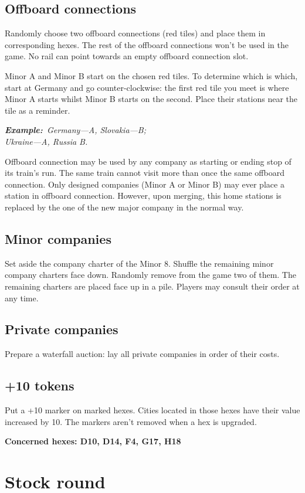 \documentclass[10pt,a4paper,twocolumn]{article}
\newcommand{\Example}{\textbf{Example:}}
\begin{document}
\subsection{Offboard connections}
Randomly choose two offboard connections (red tiles) and place them in corresponding hexes. The rest of the offboard connections won't be used in the game. No rail can point towards an empty offboard connection slot.

Minor A and Minor B start on the chosen red tiles. To determine which is which, start at Germany and go counter-clockwise: the first red tile you meet is where Minor A starts whilst Minor B starts on the second. Place their stations near the tile as a reminder.

\textit{\Example~Germany—A, Slovakia—B;\\Ukraine—A, Russia B.}

Offboard connection may be used by any company as starting or ending stop of its train's run. The same train cannot visit more than once the same offboard connection. Only designed companies (Minor A or Minor B) may ever place a station in offboard connection. However, upon merging, this home stations is replaced by the one of the new major company in the normal way.

\subsection{Minor companies}
Set aside the company charter of the Minor 8. Shuffle the remaining minor company charters face down. Randomly remove from the game two of them. The remaining charters are placed face up in a pile. Players may consult their order at any time. 

\subsection{Private companies}
Prepare a waterfall auction: lay all private companies in order of their costs.

\subsection{+10 tokens}
Put a +10 marker on marked hexes. Cities located in those hexes have their value increased by 10. The markers aren't removed when a hex is upgraded.

\textbf{Concerned hexes: D10, D14, F4, G17, H18}


\section{Stock round}
\end{document}
